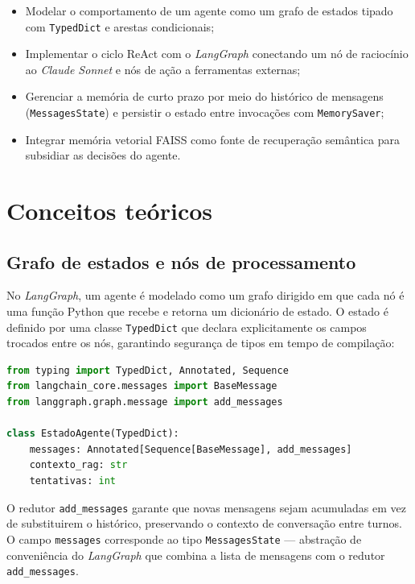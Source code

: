 \begin{itemize}[leftmargin=*]
  \item Modelar o comportamento de um agente como um grafo de estados
        tipado com \texttt{TypedDict} e arestas condicionais;
  \item Implementar o ciclo ReAct com o \textit{LangGraph} conectando
        um n\'o de racioc\'inio ao \textit{Claude Sonnet} e n\'os de
        a\c{c}\~ao a ferramentas externas;
  \item Gerenciar a mem\'oria de curto prazo por meio do hist\'orico
        de mensagens (\texttt{MessagesState}) e persistir o estado entre
        invoca\c{c}\~oes com \texttt{MemorySaver};
  \item Integrar mem\'oria vetorial FAISS como fonte de
        recupera\c{c}\~ao sem\^antica para subsidiar as decis\~oes
        do agente.
\end{itemize}

\section{Conceitos te\'oricos}

\subsection{Grafo de estados e n\'os de processamento}

No \textit{LangGraph}, um agente \'e modelado como um grafo dirigido
em que cada n\'o \'e uma fun\c{c}\~ao Python que recebe e retorna um
dicion\'ario de estado. O estado \'e definido por uma classe
\texttt{TypedDict} que declara explicitamente os campos trocados entre
os n\'os, garantindo segurança de tipos em tempo de compila\c{c}\~ao:

\begin{lstlisting}[language=Python,
  caption={Defini\c{c}\~ao do estado do agente.},
  label={lst:agent_state}]
from typing import TypedDict, Annotated, Sequence
from langchain_core.messages import BaseMessage
from langgraph.graph.message import add_messages

class EstadoAgente(TypedDict):
    messages: Annotated[Sequence[BaseMessage], add_messages]
    contexto_rag: str
    tentativas: int
\end{lstlisting}

O redutor \texttt{add\_messages} garante que novas mensagens sejam
acumuladas em vez de substituirem o hist\'orico, preservando o contexto
de conversa\c{c}\~ao entre turnos. O campo \texttt{messages} corresponde
ao tipo \texttt{MessagesState} --- abstra\c{c}\~ao de conveni\^encia
do \textit{LangGraph} que combina a lista de mensagens com o redutor
\texttt{add\_messages}.

